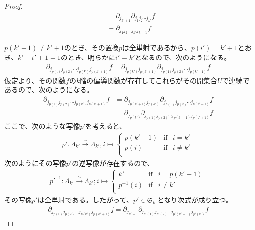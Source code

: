 \documentclass[dvipdfmx]{jsarticle}
\begin{document}
\begin{proof}
\begin{align*}
&= \partial_{j_{k' + 1}}\partial_{j_{1}j_{2}\cdots j_{k'}}f\\
&= \partial_{j_{1}j_{2}\cdots j_{k'}j_{k' + 1}}f
\end{align*}\par
$p\left( k' + 1 \right) \neq k' + 1$のとき、その置換$p$は全単射であるから、$p\left( i' \right) = k' + 1$とおき、$k' - i' + 1 = 1$のとき、明らかに$i' = k'$となるので、次のようになる。
\begin{align*}
\partial_{j_{p(1)}j_{p(2)}\cdots j_{p\left( k' \right)}j_{p\left( k' + 1 \right)}}f = \partial_{j_{p\left( k' \right)}j_{p\left( k' + 1 \right)}}\partial_{j_{p(1)}j_{p(2)}\cdots j_{p\left( k' - 1 \right)}}f
\end{align*}
仮定より、その関数$f$の$k$階の偏導関数が存在してこれらがその開集合$U$で連続であるので、次のようになる。
\begin{align*}
\partial_{j_{p(1)}j_{p(2)}\cdots j_{p\left( k' \right)}j_{p\left( k' + 1 \right)}}f &= \partial_{j_{p\left( k' + 1 \right)}j_{p\left( k' \right)}}\partial_{j_{p(1)}j_{p(2)}\cdots j_{p\left( k' - 1 \right)}}f\\
&= \partial_{j_{p\left( k' \right)}}\partial_{j_{p(1)}j_{p(2)}\cdots j_{p\left( k' - 1 \right)}j_{p\left( k' + 1 \right)}}f
\end{align*}
ここで、次のような写像$p'$を考えると、
\begin{align*}
p':\varLambda_{k'}\overset{\sim}{\rightarrow}\varLambda_{k'};i \mapsto \left\{ \begin{matrix}
p\left( k' + 1 \right) & \mathrm{if} & i = k' \\
p(i) & \mathrm{if} & i \neq k' \\
\end{matrix} \right.\ 
\end{align*}
次のようにその写像$p'$の逆写像が存在するので、
\begin{align*}
{p'}^{- 1}:\varLambda_{k'}\overset{\sim}{\rightarrow}\varLambda_{k'};i \mapsto \left\{ \begin{matrix}
k' & \mathrm{if} & i = p\left( k' + 1 \right) \\
p^{- 1}(i) & \mathrm{if} & i \neq k' \\
\end{matrix} \right.\ 
\end{align*}
その写像$p'$は全単射である。したがって、$p' \in \mathfrak{S}_{k'}$となり次式が成り立つ。
\begin{align*}
\partial_{j_{p(1)}j_{p(2)}\cdots j_{p\left( k' \right)}j_{p\left( k' + 1 \right)}}f = \partial_{j_{k' + 1}}\partial_{j_{p'(1)}j_{p'(2)}\cdots j_{p'\left( k' - 1 \right)}j_{p'\left( k' \right)}}f

\end{align*}
\end{proof}
\end{document}

